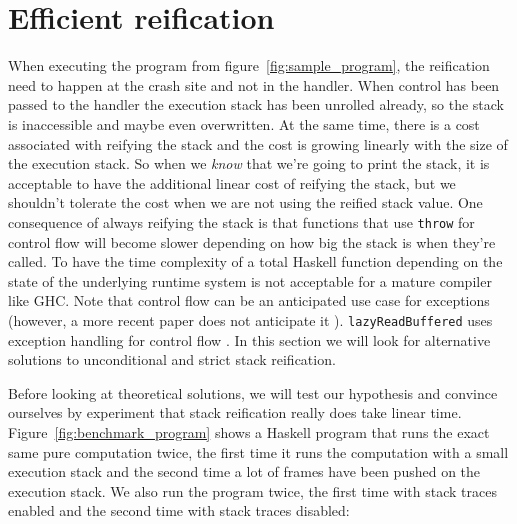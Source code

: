 \section{Efficient reification} \label{sec:lazy_reification}

When executing the program from figure~\ref{fig:sample_program}, the reification need to happen at the crash site and
not in the handler. When control has been passed to the handler the
execution stack has been unrolled already, so the stack is inaccessible
and maybe even overwritten. At the same time, there is a cost associated
with reifying the stack and the cost is growing linearly with the size
of the execution stack. So when we \emph{know} that we're going to print
the stack, it is acceptable to have the additional linear cost of
reifying the stack, but we shouldn't tolerate the cost when we are not
using the reified stack value. One consequence of always reifying the
stack is that functions that use \texttt{throw} for control flow will
become slower depending on how big the stack is when they're called.
To have the time complexity of a total Haskell function depending on
the state of the underlying runtime system is not acceptable for a mature
compiler like GHC. Note that control flow can be an anticipated use case for
exceptions \cite{peyton1999semantics} (however, a more recent paper
does not anticipate it \cite{marlow2006extensible}). \texttt{lazyReadBuffered} uses exception handling
for control flow \cite{github_lazyReadBuffered_control_flow}.
In this section we will look for alternative solutions
to unconditional and strict stack reification.

Before looking at theoretical solutions, we will test our hypothesis
and convince ourselves by experiment that stack reification really does
take linear time. Figure~\ref{fig:benchmark_program} shows a Haskell
program that runs the exact same pure computation twice, the first time
it runs the computation with a small execution stack and the second time
a lot of frames have been pushed on the execution stack. We also run the
program twice, the first time with stack traces enabled and the
second time with stack traces disabled:

